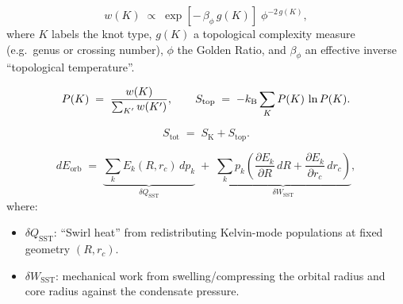\documentclass[11pt]{article}
\newcommand{\rc}{r_c}                                    %
\begin{document}
            \begin{equation}
                w(K)
                \;\propto\;
                \exp\!\left[-\,\beta_{\phi}\,g(K)\right]
                \;\phi^{-2\,g(K)},
                \label{eq:GoldenWeight}
            \end{equation}
            where \(K\) labels the knot type, \(g(K)\) a topological complexity measure
            (e.g.\ genus or crossing number), \(\phi\) the Golden Ratio, and \(\beta_{\phi}\)
            an effective inverse “topological temperature”.

            \begin{equation}
                P(K)
                \;=\;
                \frac{w(K)}{\sum_{K'} w(K')},
                \qquad
                S_{\mathrm{top}}
                \;=\;
                -k_{\mathrm{B}} \sum_{K} P(K)\,\ln P(K).
                \label{eq:Stop_def}
            \end{equation}

            \begin{equation}
                S_{\mathrm{tot}}
                \;=\;
                S_{\mathrm{K}} + S_{\mathrm{top}}.
                \label{eq:Stot_def}
            \end{equation}

            \begin{equation}
                dE_{\mathrm{orb}}
                \;=\;
                \underbrace{\sum_k E_k(R,\rc)\,dp_k}_{\displaystyle \delta Q_{\mathrm{SST}}}
                \;+\;
                \underbrace{\sum_k p_k
                \left(
                    \frac{\partial E_k}{\partial R}\,dR
                +
                    \frac{\partial E_k}{\partial \rc}\,d\rc
                \right)}_{\displaystyle \delta W_{\mathrm{SST}}},
                \label{eq:SSTFirstLaw}
            \end{equation}
            where:
            \begin{itemize}
                \item \(\delta Q_{\mathrm{SST}}\): “Swirl heat” from redistributing Kelvin-mode
                populations at fixed geometry \((R,\rc)\).
                \item \(\delta W_{\mathrm{SST}}\): mechanical work from swelling/compressing the
                orbital radius and core radius against the condensate pressure.
            \end{itemize}
\end{document}
